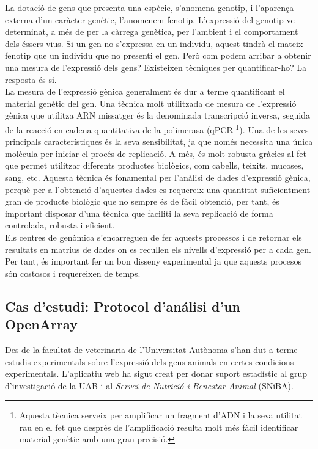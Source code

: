 \documentclass[english]{article}
\begin{document}
La dotació de gens que presenta una espècie, s'anomena genotip, i l'aparen\c{c}a externa d'un caràcter genètic, l'anomenem fenotip. L'expressió del genotip ve determinat, a més de per la càrrega genètica, per l'ambient i el comportament dels éssers vius. Si un gen no s'expressa en un individu, aquest tindrà el mateix fenotip que un individu que no presenti el gen. Però com podem arribar a obtenir una mesura de l'expressió dels gens? Existeixen tècniques per quantificar-ho? La resposta és sí.
\\

La mesura de l'expressió gènica generalment és dur a terme quantificant el material genètic del gen. Una tècnica molt utilitzada de mesura de l'expressió gènica que utilitza ARN missatger és la denominada transcripció inversa, seguida de la reacció en cadena quantitativa de la polimerasa (qPCR \footnote{Aquesta tècnica serveix per amplificar un fragment d'ADN i la seva utilitat rau en el fet que després de l'amplificació resulta molt més fàcil identificar material genètic amb una gran precisió.}). Una de les seves principals característiques és la seva sensibilitat, ja que només necessita una única molècula per iniciar el procés de replicació. A més, és molt robusta gràcies al fet que permet utilitzar diferents productes biològics, com cabells, teixits, mucoses, sang, etc. Aquesta tècnica és fonamental per l'anàlisi de dades d'expressió gènica, perquè per a l'obtenció d'aquestes dades es requereix una quantitat suficientment gran de producte biològic que no sempre és de fàcil obtenció, per tant, és important disposar d'una tècnica que faciliti la seva replicació de forma controlada, robusta i eficient.
\\

Els centres de genòmica s'encarreguen de fer aquests processos i de retornar els resultats en matrius de dades on es recullen els nivells d'expressió per a cada gen. Per tant, és important fer un bon disseny experimental ja que aquests procesos són costosos i requereixen de temps.


\subsection{Cas d'estudi: Protocol d'análisi d'un OpenArray}
Des de la facultat de veterinaria de l'Universitat Autònoma s'han dut a terme estudis experimentals sobre l'expressió dels gens animals en certes condicions experimentals. L'aplicatiu web ha sigut creat per donar suport estadístic al grup d'investigació de la UAB i al \textit{Servei de Nutrició i Benestar Animal} (SNiBA).
\\
\end{document}
